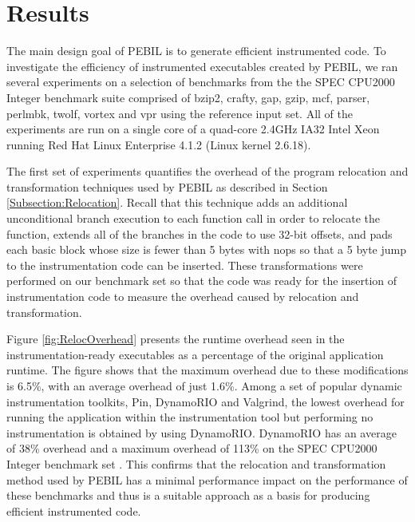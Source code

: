 \section{Results}
\label{sec:Results}

The main design goal of PEBIL is to generate efficient instrumented code. To
investigate the efficiency of instrumented executables created by PEBIL, we ran
several experiments on a selection of benchmarks from the the SPEC CPU2000
Integer benchmark suite comprised of bzip2, crafty, gap, gzip, mcf, parser,
perlmbk, twolf, vortex and vpr using the reference
input set. All of the experiments are run on a single core
of a quad-core 2.4GHz IA32 Intel Xeon running Red Hat Linux Enterprise 4.1.2
(Linux kernel 2.6.18). 

The first set of experiments quantifies the overhead of the program relocation
and transformation techniques used by PEBIL as described in Section
\ref{Subsection:Relocation}. Recall that this technique adds an additional
unconditional branch execution to each function call in order to relocate the
function, extends all of the branches in the code to use 32-bit offsets, and
pads each basic block whose size is fewer than 5 bytes with nops so that a 5
byte jump to the instrumentation code can be inserted. These transformations were
performed on our benchmark set so that the code was ready for the insertion of
instrumentation code to measure the overhead caused by relocation and transformation. 

Figure \ref{fig:RelocOverhead} presents the runtime overhead seen in the
instrumentation-ready executables as a percentage of the original application
runtime. The figure shows that the maximum overhead due to these modifications
is 6.5\%, with an average overhead of just 1.6\%. Among a set of popular dynamic
instrumentation toolkits, Pin, DynamoRIO and Valgrind, the lowest overhead for
running the application within the instrumentation tool but performing no
instrumentation is obtained by using DynamoRIO. DynamoRIO has an average of 38\%
overhead and a maximum overhead of 113\% on the SPEC CPU2000 Integer benchmark
set \cite{luk2005pin}. This confirms that the relocation and transformation
method used by PEBIL has a minimal performance impact on the performance of
these benchmarks and thus is a suitable approach as a basis for producing
efficient instrumented code.

